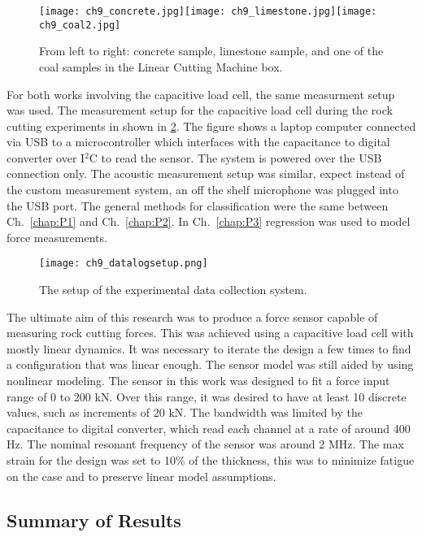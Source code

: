 \begin{figure}[ht]
\centering
\texttt{[image: ch9\_concrete.jpg]}\texttt{[image: ch9\_limestone.jpg]}\texttt{[image: ch9\_coal2.jpg]}
\caption{
From left to right: concrete sample, limestone sample, and one of the coal samples in the Linear Cutting Machine box.
}
\label{fig:samples}
\end{figure}

For both works involving the capacitive load cell, the same measurment setup was used.
The measurement setup for the capacitive load cell during the rock cutting experiments in shown in \ref{fig:datalogsetup}.
The figure shows a laptop computer connected via USB to a microcontroller which interfaces with
the capacitance to digital converter over I$^2$C to read the sensor. The system is powered over the USB connection only.
The acoustic measurement setup was similar, expect instead of the custom measurement system, an off the shelf 
microphone was plugged into the USB port. The general methods for classification were the same between 
Ch.~\ref{chap:P1} and Ch.~\ref{chap:P2}. In Ch.~\ref{chap:P3} regression was used to model force measurements.
\begin{figure}[ht]
\centering
\texttt{[image: ch9\_datalogsetup.png]}
\caption{
The setup of the experimental data collection system.
}
\label{fig:datalogsetup}
\end{figure}

The ultimate aim of this research was to produce a force sensor capable of measuring rock cutting forces. 
This was achieved using a capacitive load cell with mostly linear dynamics. It was necessary to iterate the design
a few times to find a configuration that was linear enough. The sensor model was still aided by using nonlinear modeling.
The sensor in this work was designed to fit a force input range of 0 to 200 kN.
Over this range, it was desired to have at least 10 discrete values, such as increments of 20 kN.
The bandwidth was limited by the capacitance to digital converter, 
which read each channel at a rate of around 400 Hz. The nominal resonant frequency of the sensor 
was around 2 MHz. The max strain for the design was set to 10\% of the thickness, this was to
minimize fatigue on the case and to preserve linear model assumptions.

\subsection{Summary of Results}

